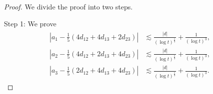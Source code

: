 \documentclass[reqno]{amsart}
\theoremstyle{plain}
\theoremstyle{definition}
\numberwithin{equation}{section}
\newcommand{\1}{\mathbbm{1}}
\begin{document}
\begin{proof}
We divide the proof into two steps.

Step 1:  We prove
\begin{align}\label{aknaisekies}
\begin{aligned}
\left|a_1-\frac{1}{5}(4d_{12}+4d_{13}+2d_{23})\right|&\lesssim \frac{|d|}{(\log{t})^{\frac{1}{4}}}+\frac{1}{(\log{t})^3},
\\
\left|a_2-\frac{1}{5}(4d_{12}+2d_{13}+4d_{23})\right|&\lesssim\frac{|d|}{(\log{t})^{\frac{1}{4}}}+\frac{1}{(\log{t})^3},
\\
\left|a_3-\frac{1}{5}(2d_{12}+4d_{13}+4d_{23})\right|&\lesssim \frac{|d|}{(\log{t})^{\frac{1}{4}}}+\frac{1}{(\log{t})^3}.
\end{aligned}
\end{align}




\end{proof}
\end{document}
